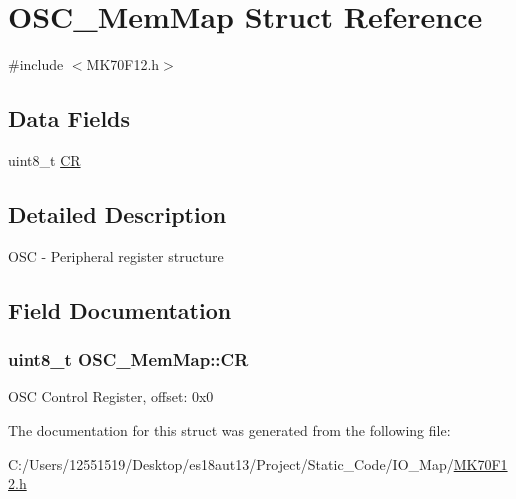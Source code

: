 \hypertarget{struct_o_s_c___mem_map}{}\section{O\+S\+C\+\_\+\+Mem\+Map Struct Reference}
\label{struct_o_s_c___mem_map}


{\ttfamily \#include $<$M\+K70\+F12.\+h$>$}

\subsection*{Data Fields}
\begin{DoxyCompactItemize}
\item 
uint8\+\_\+t \hyperlink{struct_o_s_c___mem_map_adb3c443099915a22c9951ff23c8eaa16}{C\+R}
\end{DoxyCompactItemize}


\subsection{Detailed Description}
O\+S\+C -\/ Peripheral register structure 

\subsection{Field Documentation}
\hypertarget{struct_o_s_c___mem_map_adb3c443099915a22c9951ff23c8eaa16}{}
\subsubsection[{C\+R}]{\setlength{\rightskip}{0pt plus 5cm}uint8\+\_\+t O\+S\+C\+\_\+\+Mem\+Map\+::\+C\+R}\label{struct_o_s_c___mem_map_adb3c443099915a22c9951ff23c8eaa16}
O\+S\+C Control Register, offset\+: 0x0 

The documentation for this struct was generated from the following file\+:\begin{DoxyCompactItemize}
\item 
C\+:/\+Users/12551519/\+Desktop/es18aut13/\+Project/\+Static\+\_\+\+Code/\+I\+O\+\_\+\+Map/\hyperlink{_m_k70_f12_8h}{M\+K70\+F12.\+h}\end{DoxyCompactItemize}
